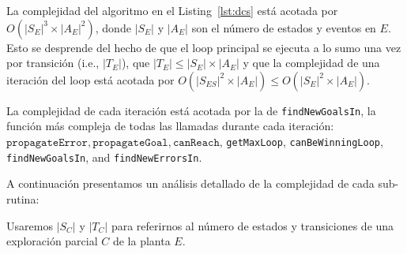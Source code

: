 La complejidad del algoritmo en el Listing~\ref{lst:dcs} está acotada por
	$O(|S_E|^3 
	\times |A_E|^2)$, donde $|S_E|$ y $|A_E|$ son el número de estados y eventos en
	$E$. Esto se desprende del hecho de que el loop principal se ejecuta a lo sumo una vez por transición (i.e., 
	$|T_{E}|$), que $|T_{E}| \leq|S_{E}|\times|A_E|$ y que la complejidad de una iteración del loop está acotada por $O(|S_{ES}|^2 \times |A_{E}|) \leq O(|S_{E}|^2 \times 
	|A_{E}|) $.

La complejidad de cada iteración está acotada por la de \texttt{findNewGoalsIn}, la función más compleja de todas las llamadas durante cada iteración: $\texttt{propagateError}, \texttt{propagateGoal}, 
	\texttt{canReach}$, \texttt{getMaxLoop}, \texttt{canBeWinningLoop}, 
	\texttt{findNewGoalsIn}, and \texttt{findNewErrorsIn}.
	
A continuación presentamos un análisis detallado de la complejidad de cada sub-rutina: 

Usaremos $|S_C|$ y $|T_C|$ para referirnos al número de estados y transiciones de una exploración parcial $C$ de la planta $E$.


